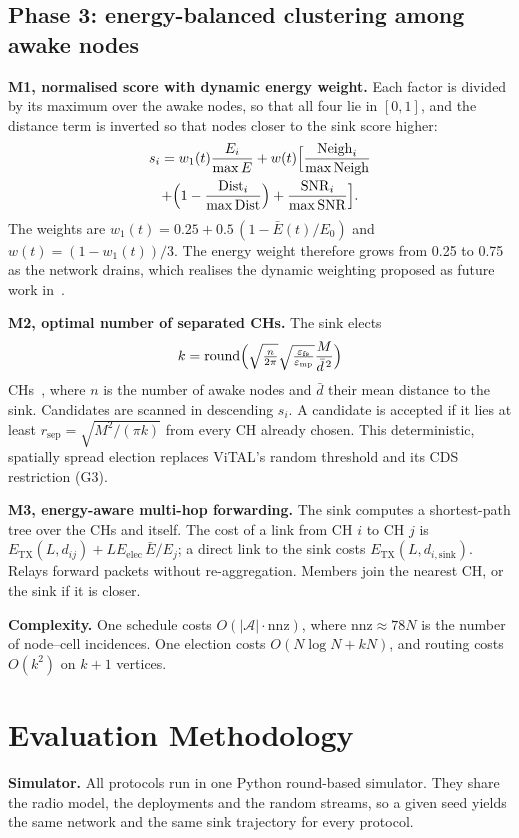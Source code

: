 \documentclass[journal]{IEEEtran}
\begin{document}
\subsection{Phase 3: energy-balanced clustering among awake nodes}
\textbf{M1, normalised score with dynamic energy weight.} Each factor is divided by its maximum over the awake nodes, so that all four lie in $[0,1]$, and the distance term is inverted so that nodes closer to the sink score higher:
\begin{multline}
s_i=w_1(t)\frac{E_i}{\max E}+w(t)\Bigl[\frac{\mathrm{Neigh}_i}{\max\mathrm{Neigh}}\\+\Bigl(1-\frac{\mathrm{Dist}_i}{\max\mathrm{Dist}}\Bigr)+\frac{\mathrm{SNR}_i}{\max\mathrm{SNR}}\Bigr].
\end{multline}
The weights are $w_1(t)=0.25+0.5\,(1-\bar E(t)/E_0)$ and $w(t)=(1-w_1(t))/3$. The energy weight therefore grows from 0.25 to 0.75 as the network drains, which realises the dynamic weighting proposed as future work in~\cite{ali2025vital}.

\textbf{M2, optimal number of separated CHs.} The sink elects
\begin{equation}
k=\mathrm{round}\Bigl(\sqrt{\tfrac{n}{2\pi}}\sqrt{\tfrac{\varepsilon_{\mathrm{fs}}}{\varepsilon_{\mathrm{mp}}}}\frac{M}{\bar d^{\,2}}\Bigr)
\end{equation}
CHs~\cite{heinzelman2002leachc}, where $n$ is the number of awake nodes and $\bar d$ their mean distance to the sink. Candidates are scanned in descending $s_i$. A candidate is accepted if it lies at least $r_{\mathrm{sep}}=\sqrt{M^2/(\pi k)}$ from every CH already chosen. This deterministic, spatially spread election replaces ViTAL's random threshold and its CDS restriction (G3).

\textbf{M3, energy-aware multi-hop forwarding.} The sink computes a shortest-path tree over the CHs and itself. The cost of a link from CH $i$ to CH $j$ is $E_{\mathrm{TX}}(L,d_{ij})+L E_{\mathrm{elec}}\,\bar E/E_j$; a direct link to the sink costs $E_{\mathrm{TX}}(L,d_{i,\mathrm{sink}})$. Relays forward packets without re-aggregation. Members join the nearest CH, or the sink if it is closer.

\textbf{Complexity.} One schedule costs $O(|\mathcal{A}|\cdot\mathrm{nnz})$, where $\mathrm{nnz}\approx78N$ is the number of node--cell incidences. One election costs $O(N\log N+kN)$, and routing costs $O(k^2)$ on $k+1$ vertices.

\section{Evaluation Methodology}\label{sec:setup}
\textbf{Simulator.} All protocols run in one Python round-based simulator. They share the radio model, the deployments and the random streams, so a given seed yields the same network and the same sink trajectory for every protocol.
\end{document}
